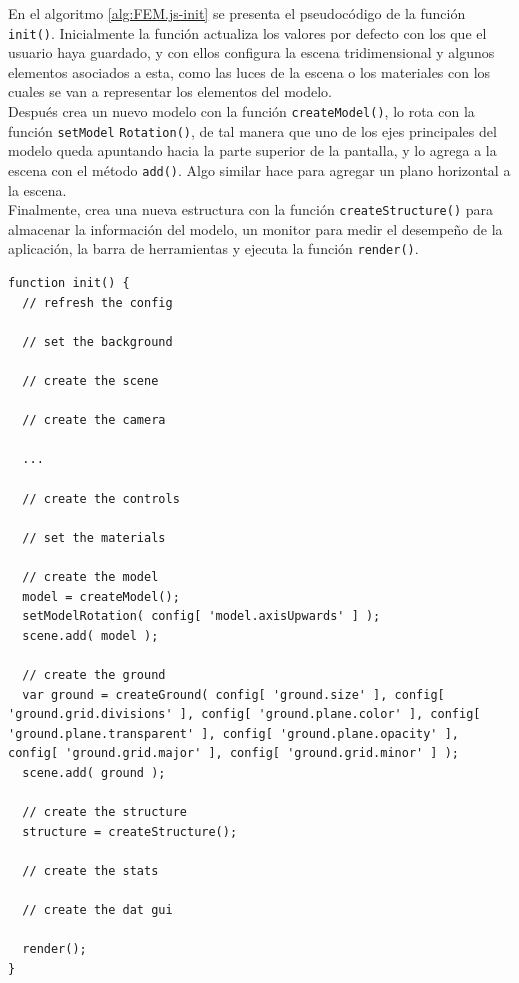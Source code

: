En el algoritmo \ref{alg:FEM.js-init} se presenta el pseudocódigo de la función \verb|init()|. Inicialmente la función actualiza los valores por defecto con los que el usuario haya guardado, y con ellos configura la escena tridimensional y algunos elementos asociados a esta, como las luces de la escena o los materiales con los cuales se van a representar los elementos del modelo.\\

Después crea un nuevo modelo con la función \verb|createModel()|, lo rota con la función \verb|setModel| \verb|Rotation()|, de tal manera que uno de los ejes principales del modelo queda apuntando hacia la parte superior de la pantalla, y lo agrega a la escena con el método \verb|add()|. Algo similar hace para agregar un plano horizontal a la escena.\\

Finalmente, crea una nueva estructura con la función \verb|createStructure()| para almacenar la información del modelo, un monitor para medir el desempeño de la aplicación, la barra de herramientas y ejecuta la función \verb|render()|.\\

\begin{lstlisting}[language={},caption=Pseudocódigo de la función \texttt{init()} del archivo \texttt{FEM.js}.,label=alg:FEM.js-init,frame=single]
function init() {
  // refresh the config
  
  // set the background
  
  // create the scene
  
  // create the camera

  ...
  
  // create the controls
  
  // set the materials
  
  // create the model
  model = createModel();
  setModelRotation( config[ 'model.axisUpwards' ] );
  scene.add( model );
  
  // create the ground
  var ground = createGround( config[ 'ground.size' ], config[ 'ground.grid.divisions' ], config[ 'ground.plane.color' ], config[ 'ground.plane.transparent' ], config[ 'ground.plane.opacity' ], config[ 'ground.grid.major' ], config[ 'ground.grid.minor' ] );
  scene.add( ground );
  
  // create the structure
  structure = createStructure();

  // create the stats

  // create the dat gui

  render();
}
\end{lstlisting}
\bigskip

